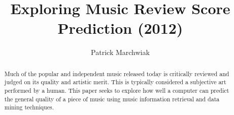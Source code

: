 \documentclass{acm_proc_article-sp}
\begin{document}
\title{Exploring Music Review Score Prediction (2012)}

%
%
%
%
%

%
\author{
%
%
\alignauthor
Patrick Marchwiak\\
}

\maketitle
\begin{abstract}
Much of the popular and independent music released today is critically
reviewed and judged on its quality and artistic merit.
This is typically considered a subjective art performed by a human.
This paper seeks to explore how well a computer can predict the
general quality of a piece of music using music information retrieval and
data mining techniques.
\end{abstract}
\end{document}
